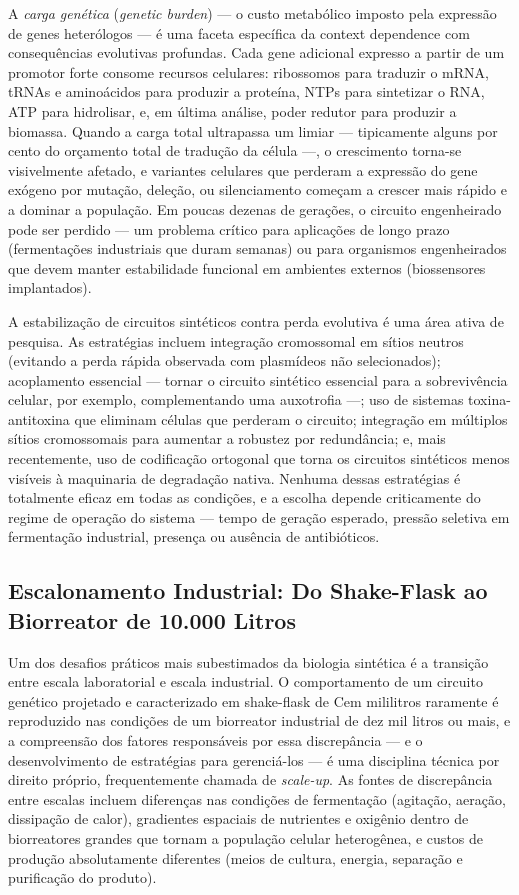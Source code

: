 A \emph{carga genética} (\emph{genetic burden}) --- o custo metabólico imposto pela expressão de genes heterólogos --- é uma faceta específica da context dependence com consequências evolutivas profundas. Cada gene adicional expresso a partir de um promotor forte consome recursos celulares: ribossomos para traduzir o mRNA, tRNAs e aminoácidos para produzir a proteína, NTPs para sintetizar o RNA, ATP para hidrolisar, e, em última análise, poder redutor para produzir a biomassa. Quando a carga total ultrapassa um limiar --- tipicamente alguns por cento do orçamento total de tradução da célula ---, o crescimento torna-se visivelmente afetado, e variantes celulares que perderam a expressão do gene exógeno por mutação, deleção, ou silenciamento começam a crescer mais rápido e a dominar a população. Em poucas dezenas de gerações, o circuito engenheirado pode ser perdido --- um problema crítico para aplicações de longo prazo (fermentações industriais que duram semanas) ou para organismos engenheirados que devem manter estabilidade funcional em ambientes externos (biossensores implantados).

A estabilização de circuitos sintéticos contra perda evolutiva é uma área ativa de pesquisa. As estratégias incluem integração cromossomal em sítios neutros (evitando a perda rápida observada com plasmídeos não selecionados); acoplamento essencial --- tornar o circuito sintético essencial para a sobrevivência celular, por exemplo, complementando uma auxotrofia ---; uso de sistemas toxina-antitoxina que eliminam células que perderam o circuito; integração em múltiplos sítios cromossomais para aumentar a robustez por redundância; e, mais recentemente, uso de codificação ortogonal que torna os circuitos sintéticos menos visíveis à maquinaria de degradação nativa. Nenhuma dessas estratégias é totalmente eficaz em todas as condições, e a escolha depende criticamente do regime de operação do sistema --- tempo de geração esperado, pressão seletiva em fermentação industrial, presença ou ausência de antibióticos.


\subsection{Escalonamento Industrial: Do Shake-Flask ao Biorreator de 10.000 Litros}

Um dos desafios práticos mais subestimados da biologia sintética é a transição entre escala laboratorial e escala industrial. O comportamento de um circuito genético projetado e caracterizado em shake-flask de Cem mililitros raramente é reproduzido nas condições de um biorreator industrial de dez mil litros ou mais, e a compreensão dos fatores responsáveis por essa discrepância --- e o desenvolvimento de estratégias para gerenciá-los --- é uma disciplina técnica por direito próprio, frequentemente chamada de \emph{scale-up}. As fontes de discrepância entre escalas incluem diferenças nas condições de fermentação (agitação, aeração, dissipação de calor), gradientes espaciais de nutrientes e oxigênio dentro de biorreatores grandes que tornam a população celular heterogênea, e custos de produção absolutamente diferentes (meios de cultura, energia, separação e purificação do produto).

